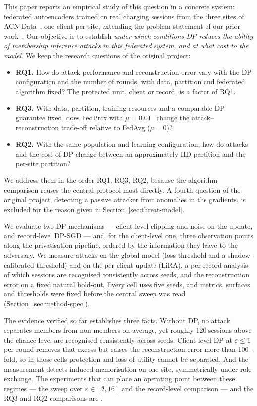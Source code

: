 This paper reports an empirical study of this question in a concrete system:
federated autoencoders trained on real charging sessions from the three sites
of ACN-Data~\cite{lee2019acndata}, one client per site, extending the problem
statement of our prior work~\cite{imperatrice2026toward}. Our objective is to
establish \emph{under which conditions DP reduces the ability of membership
inference attacks in this federated system, and at what cost to the model}. We
keep the research questions of the original project:

\begin{itemize}
\item \textbf{RQ1.} How do attack performance and reconstruction error vary
with the DP configuration and the number of rounds, with data, partition and
federated algorithm fixed? The protected unit, client or record, is a factor
of RQ1.
\item \textbf{RQ3.} With data, partition, training resources and a comparable
DP guarantee fixed, does FedProx with $\mu = 0.01$~\cite{li2020fedprox} change
the attack--reconstruction trade-off relative to FedAvg ($\mu = 0$)?
\item \textbf{RQ2.} With the same population and learning configuration, how
do attacks and the cost of DP change between an approximately IID partition
and the per-site partition?
\end{itemize}

\noindent We address them in the order RQ1, RQ3, RQ2, because the algorithm
comparison reuses the central protocol most directly. A fourth question of the
original project, detecting a passive attacker from anomalies in the
gradients, is excluded for the reason given in Section~\ref{sec:threat-model}.

We evaluate two DP mechanisms --- client-level clipping and noise on the
update, and record-level DP-SGD --- and, for the client-level one, three
observation points along the privatisation pipeline, ordered by the
information they leave to the adversary. We measure attacks on the global
model (loss threshold and a shadow-calibrated threshold) and on the per-client
update (LiRA), a per-record analysis of which sessions are recognised
consistently across seeds, and the reconstruction error on a fixed natural
hold-out. Every cell uses five seeds, and metrics, surfaces and thresholds were
fixed before the central sweep was read (Section~\ref{sec:method-spec}).

The evidence verified so far establishes three facts. Without DP, no attack
separates members from non-members on average, yet roughly 120 sessions above
the chance level are recognised consistently across seeds. Client-level DP at
$\varepsilon \le 1$ per round removes that excess but raises the
reconstruction error more than 100-fold, so in those cells protection and loss
of utility cannot be separated. And the measurement detects induced
memorisation on one site, symmetrically under role exchange. The experiments
that can place an operating point between these regimes --- the sweep over
$\varepsilon \in [2, 16]$ and the record-level comparison --- and the RQ3 and
RQ2 comparisons are .

